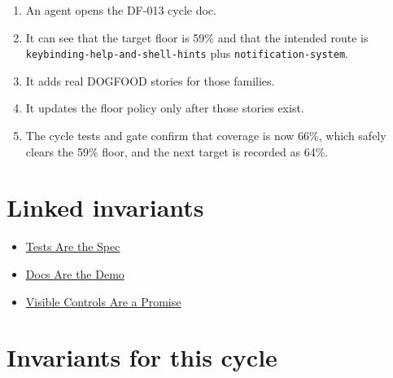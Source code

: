 \begin{enumerate}
\def\labelenumi{\arabic{enumi}.}
\tightlist
\item
  An agent opens the DF-013 cycle doc.
\item
  It can see that the target floor is 59\% and that the intended route is \texttt{k\allowbreak{}e\allowbreak{}y\allowbreak{}b\allowbreak{}i\allowbreak{}n\allowbreak{}d\allowbreak{}i\allowbreak{}n\allowbreak{}g\allowbreak{}-\allowbreak{}h\allowbreak{}e\allowbreak{}l\allowbreak{}p\allowbreak{}-\allowbreak{}a\allowbreak{}n\allowbreak{}d\allowbreak{}-\allowbreak{}s\allowbreak{}h\allowbreak{}e\allowbreak{}l\allowbreak{}l\allowbreak{}-\allowbreak{}h\allowbreak{}i\allowbreak{}n\allowbreak{}t\allowbreak{}s} plus \texttt{n\allowbreak{}o\allowbreak{}t\allowbreak{}i\allowbreak{}f\allowbreak{}i\allowbreak{}c\allowbreak{}a\allowbreak{}t\allowbreak{}i\allowbreak{}o\allowbreak{}n\allowbreak{}-\allowbreak{}s\allowbreak{}y\allowbreak{}s\allowbreak{}t\allowbreak{}e\allowbreak{}m}.
\item
  It adds real DOGFOOD stories for those families.
\item
  It updates the floor policy only after those stories exist.
\item
  The cycle tests and gate confirm that coverage is now 66\%, which safely clears the 59\% floor, and the next target is recorded as 64\%.
\end{enumerate}

\section{Linked invariants}\label{record-075-linked-invariants}

\begin{itemize}
\tightlist
\item
  \href{https://github.com/flyingrobots/bijou/blob/cbd70612140e7a450d764b3c7be1c6af878b99bc/docs/invariants/tests-are-the-spec.md}{Tests Are the Spec}
\item
  \href{https://github.com/flyingrobots/bijou/blob/cbd70612140e7a450d764b3c7be1c6af878b99bc/docs/invariants/docs-are-the-demo.md}{Docs Are the Demo}
\item
  \href{https://github.com/flyingrobots/bijou/blob/cbd70612140e7a450d764b3c7be1c6af878b99bc/docs/invariants/visible-controls-are-a-promise.md}{Visible Controls Are a Promise}
\end{itemize}

\section{Invariants for this cycle}\label{record-075-invariants-for-this-cycle}


